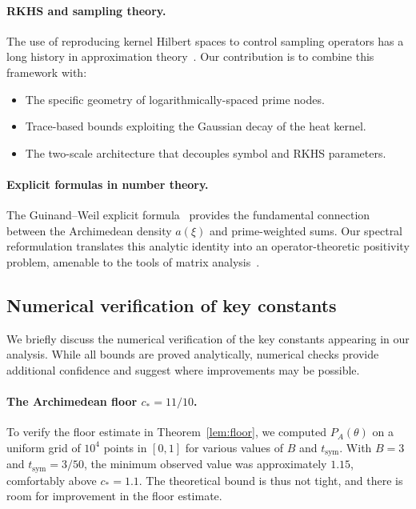 \documentclass[11pt,a4paper]{article}
\theoremstyle{definition}
\theoremstyle{remark}
\begin{document}
\paragraph{RKHS and sampling theory.}
The use of reproducing kernel Hilbert spaces to control sampling operators has a long history in approximation theory~\cite{Aronszajn1950,PaulsenRaghupathi2016}. Our contribution is to combine this framework with:
\begin{itemize}
\item The specific geometry of logarithmically-spaced prime nodes.
\item Trace-based bounds exploiting the Gaussian decay of the heat kernel.
\item The two-scale architecture that decouples symbol and RKHS parameters.
\end{itemize}

\paragraph{Explicit formulas in number theory.}
The Guinand--Weil explicit formula~\cite{Weil1952} provides the fundamental connection between the Archimedean density $a(\xi)$ and prime-weighted sums. Our spectral reformulation translates this analytic identity into an operator-theoretic positivity problem, amenable to the tools of matrix analysis~\cite{HornJohnson2013,Varga2004}.

\subsection{Numerical verification of key constants}

We briefly discuss the numerical verification of the key constants appearing in our analysis. While all bounds are proved analytically, numerical checks provide additional confidence and suggest where improvements may be possible.

\paragraph{The Archimedean floor $c_* = 11/10$.}
To verify the floor estimate in Theorem~\ref{lem:floor}, we computed $P_A(\theta)$ on a uniform grid of $10^4$ points in $[0, 1]$ for various values of $B$ and $t_{\mathrm{sym}}$. With $B = 3$ and $t_{\mathrm{sym}} = 3/50$, the minimum observed value was approximately $1.15$, comfortably above $c_* = 1.1$. The theoretical bound is thus not tight, and there is room for improvement in the floor estimate.
\end{document}
